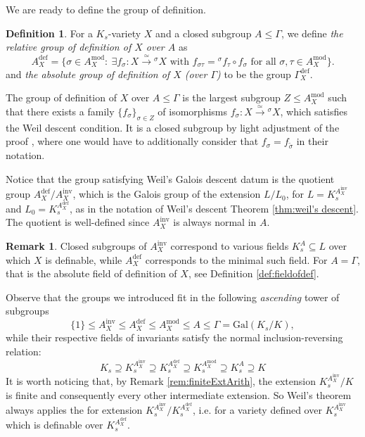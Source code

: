 \documentclass[10pt]{amsart}
\theoremstyle{definition}
\newtheorem{remark}[theorem]{Remark}
\newtheorem{definition}[theorem]{Definition}
\newcommand{\Gal}{{ \mathrm{Gal}}}
\begin{document}
We are ready to define the group of definition.

\begin{definition}
  \label{def:groupdefArith}
For a $K_s$-variety $X$ and a closed subgroup $A\leq \mathfrak{\Gamma}$, we define {\em the relative group of definition of $X$ over $A$} as 
\[
A_X^{\mathrm{def}}=\{\sigma \in A_X^{\mathrm{mod}}: \ \exists f_\sigma\colon X \xrightarrow{\simeq} {^\sigma\! X} 
\text{ with } f_{\sigma\tau}={^\sigma \! f_{\tau} \circ f_\sigma} \text{ for all } \sigma,\tau \in A_X^{\mathrm{mod}} \}.
\]
and {\em the absolute group of definition of $X$ (over $\mathfrak{\Gamma}$)} to be the group $\mathfrak{\Gamma}_X^{\mathrm{def}}$.
\end{definition}



The group of definition of $X$ over $A \leq \mathfrak{\Gamma}$ is the largest subgroup $Z\leq A_X^{\mathrm{mod}}$ such that there exists a family $\{ f_\sigma \}_{\sigma \in Z}$ of isomorphisms $f_\sigma\colon X \xrightarrow{\simeq} {^\sigma\! X} $, which satisfies the Weil descent condition. It is a closed subgroup by light adjustment of the proof \cite[Proposition 2.1]{DebesEmsalem}, where one would have to additionally consider that $f_{\sigma} = f_{\tilde{\sigma}}$ in their notation.

Notice that the group satisfying Weil's Galois descent datum is the quotient group $A_X^{\mathrm{def}} / A_X^{\mathrm{inv}}$, which is the Galois group of the extension $L/L_0$, for $L=K_s^{A_X^{\mathrm{inv}}}$ and $L_0=K_s^{A_X^{\mathrm{def}}}$, as in the notation of Weil's descent Theorem \ref{thm:weil's descent}. The quotient is well-defined since $A_X^{\mathrm{inv}}$ is always normal in $A$.


\begin{remark}
Closed subgroups of $A_X^{\mathrm{inv}}$ correspond to various fields $K_s^A \subseteq L $ over which $X$ is definable, while $A_X^{\mathrm{def}}$ corresponds to the minimal such field. For $A=\mathfrak{\Gamma}$, that is the absolute field  of definition of $X$, see Definition \ref{def:fieldofdef}.
\end{remark}

Observe that the groups we introduced fit in the following {\em ascending} tower of subgroups 
\[
\{1\} \leq A_X^{\mathrm{inv}} \leq A_X^{\mathrm{def}} \leq A_X^{\mathrm{mod}} \leq A \leq \mathfrak{\Gamma} = \Gal(K_s/K),
\]
while their respective fields of invariants satisfy the normal inclusion-reversing relation:
\[
K_s \supseteq K_s^{A_X^{\mathrm{inv}}} \supseteq K_s^{A_X^{\mathrm{def}}} \supseteq K_s^{A_X^{\mathrm{mod}}} \supseteq K_s^A \supseteq K
\]
It is worth noticing that, by Remark \ref{rem:finiteExtArith}, the extension $ K_s^{A_X^{\mathrm{inv}}} / K$ is finite and consequently every other intermediate extension. So Weil's theorem always applies the for extension $ K_s^{A_X^{\mathrm{inv}}} / K_s^{A_X^{\mathrm{def}}}$, i.e. for a variety defined over $K_s^{A_X^{\mathrm{inv}}}$ which is definable over $K_s^{A_X^{\mathrm{def}}}$. 
\end{document}
